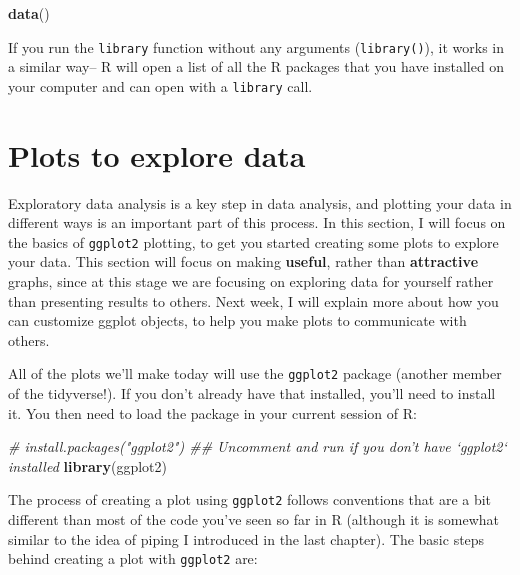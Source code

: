 \documentclass[]{book}
\makeatletter
\newenvironment{Shaded}{\begin{snugshade}}{\end{snugshade}}
\newcommand{\KeywordTok}[1]{\textcolor[rgb]{0.13,0.29,0.53}{\textbf{#1}}}
\newcommand{\CommentTok}[1]{\textcolor[rgb]{0.56,0.35,0.01}{\textit{#1}}}
\newcommand{\NormalTok}[1]{#1}
\newenvironment{kframe}{%
\medskip{}
\setlength{\fboxsep}{.8em}
 \def\at@end@of@kframe{}%
 \ifinner\ifhmode%
  \def\at@end@of@kframe{\end{minipage}}%
  \begin{minipage}{\columnwidth}%
 \fi\fi%
 \def\FrameCommand##1{\hskip\@totalleftmargin \hskip-\fboxsep
 \colorbox{shadecolor}{##1}\hskip-\fboxsep
     \hskip-\linewidth \hskip-\@totalleftmargin \hskip\columnwidth}%
 \MakeFramed {\advance\hsize-\width
   \@totalleftmargin\z@ \linewidth\hsize
   \@setminipage}}%
 {\par\unskip\endMakeFramed%
 \at@end@of@kframe}
\renewenvironment{Shaded}{\begin{kframe}}{\end{kframe}}
\newenvironment{rmdblock}[1]
  {
  \begin{itemize}
  \renewcommand{\labelitemi}{
    \raisebox{-.7\height}[0pt][0pt]{
      {\setkeys{Gin}{width=3em,keepaspectratio}\texttt{[image: images/\#1]}}
    }
  }
  \setlength{\fboxsep}{1em}
  \begin{kframe}
  \item
  }
  {
  \end{kframe}
  \end{itemize}
  }
\newenvironment{rmdnote}
  {\begin{rmdblock}{note}}
  {\end{rmdblock}}
\theoremstyle{definition}
\theoremstyle{definition}
\theoremstyle{definition}
\theoremstyle{remark}
\makeatother
\begin{document}
\begin{Shaded}
\begin{Highlighting}[]
\KeywordTok{data}\NormalTok{()}
\end{Highlighting}
\end{Shaded}

\begin{rmdnote}
If you run the \texttt{library} function without any arguments
(\texttt{library()}), it works in a similar way-- R will open a list of
all the R packages that you have installed on your computer and can open
with a \texttt{library} call.
\end{rmdnote}

\section{Plots to explore data}\label{plots-to-explore-data}

Exploratory data analysis is a key step in data analysis, and plotting
your data in different ways is an important part of this process. In
this section, I will focus on the basics of \texttt{ggplot2} plotting,
to get you started creating some plots to explore your data. This
section will focus on making \textbf{useful}, rather than
\textbf{attractive} graphs, since at this stage we are focusing on
exploring data for yourself rather than presenting results to others.
Next week, I will explain more about how you can customize ggplot
objects, to help you make plots to communicate with others.

All of the plots we'll make today will use the \texttt{ggplot2} package
(another member of the tidyverse!). If you don't already have that
installed, you'll need to install it. You then need to load the package
in your current session of R:

\begin{Shaded}
\begin{Highlighting}[]
\CommentTok{# install.packages("ggplot2")  ## Uncomment and run if you don't have `ggplot2` installed}
\KeywordTok{library}\NormalTok{(ggplot2)}
\end{Highlighting}
\end{Shaded}

The process of creating a plot using \texttt{ggplot2} follows
conventions that are a bit different than most of the code you've seen
so far in R (although it is somewhat similar to the idea of piping I
introduced in the last chapter). The basic steps behind creating a plot
with \texttt{ggplot2} are:
\end{document}
